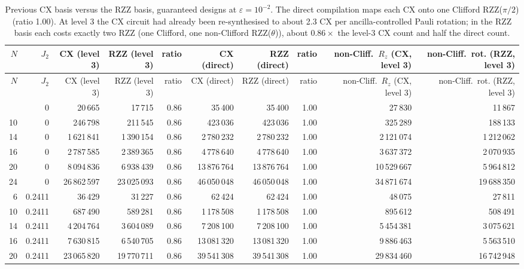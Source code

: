 \documentclass[11pt]{article}
\begin{document}
{\small
\begin{longtable}{rrrrrrrrrr}
\caption{Previous CX basis versus the RZZ basis, guaranteed designs at $\varepsilon=10^{-2}$. The direct compilation maps each CX onto one Clifford RZZ($\pi/2$) (ratio 1.00). At level 3 the CX circuit had already been re-synthesised to about 2.3 CX per ancilla-controlled Pauli rotation; in the RZZ basis each costs exactly two RZZ (one Clifford, one non-Clifford RZZ($\theta$)), about $0.86\times$ the level-3 CX count and half the direct count.}\label{tab:cxrzz}\\
\toprule
$N$ & $J_2$ & CX (level 3) & RZZ (level 3) & ratio & CX (direct) & RZZ (direct) & ratio & non-Cliff.\ $R_z$ (CX, level 3) & non-Cliff.\ rot. (RZZ, level 3) \\
\midrule
\endfirsthead
\toprule
$N$ & $J_2$ & CX (level 3) & RZZ (level 3) & ratio & CX (direct) & RZZ (direct) & ratio & non-Cliff.\ $R_z$ (CX, level 3) & non-Cliff.\ rot. (RZZ, level 3) \\
\midrule
\endhead
\bottomrule
\endfoot
6 & 0 & 20\,665 & 17\,715 & 0.86 & 35\,400 & 35\,400 & 1.00 & 27\,830 & 11\,867 \\
10 & 0 & 246\,798 & 211\,545 & 0.86 & 423\,036 & 423\,036 & 1.00 & 325\,289 & 188\,133 \\
14 & 0 & 1\,621\,841 & 1\,390\,154 & 0.86 & 2\,780\,232 & 2\,780\,232 & 1.00 & 2\,121\,074 & 1\,212\,062 \\
16 & 0 & 2\,787\,585 & 2\,389\,365 & 0.86 & 4\,778\,640 & 4\,778\,640 & 1.00 & 3\,637\,372 & 2\,070\,935 \\
20 & 0 & 8\,094\,836 & 6\,938\,439 & 0.86 & 13\,876\,764 & 13\,876\,764 & 1.00 & 10\,529\,667 & 5\,964\,812 \\
24 & 0 & 26\,862\,597 & 23\,025\,093 & 0.86 & 46\,050\,048 & 46\,050\,048 & 1.00 & 34\,871\,674 & 19\,688\,350 \\
6 & 0.2411 & 36\,429 & 31\,227 & 0.86 & 62\,424 & 62\,424 & 1.00 & 48\,075 & 27\,811 \\
10 & 0.2411 & 687\,490 & 589\,281 & 0.86 & 1\,178\,508 & 1\,178\,508 & 1.00 & 895\,612 & 508\,491 \\
14 & 0.2411 & 4\,204\,764 & 3\,604\,089 & 0.86 & 7\,208\,100 & 7\,208\,100 & 1.00 & 5\,454\,381 & 3\,075\,621 \\
16 & 0.2411 & 7\,630\,815 & 6\,540\,705 & 0.86 & 13\,081\,320 & 13\,081\,320 & 1.00 & 9\,886\,463 & 5\,563\,510 \\
20 & 0.2411 & 23\,065\,820 & 19\,770\,711 & 0.86 & 39\,541\,308 & 39\,541\,308 & 1.00 & 29\,834\,460 & 16\,742\,948 \\

\end{longtable}}
\end{document}
